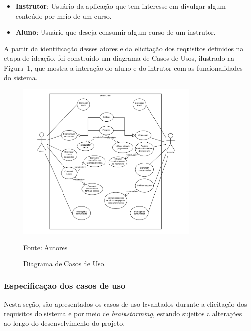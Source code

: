         \begin{itemize}
            \item \textbf{Instrutor}: Usuário da aplicação que tem interesse em divulgar algum conteúdo por meio de um curso.
            \item \textbf{Aluno}: Usuário que deseja consumir algum curso de um instrutor.
        \end{itemize}

        A partir da identificação desses atores e da elicitação dos requisitos definidos na etapa de ideação, foi construído um diagrama de Casos de Usos, ilustrado na Figura~\ref{fig:diagrama}, que mostra a interação do aluno e do intrutor com as funcionalidades do sistema.

        \begin{figure}[h]
            \centering
            \caption{Diagrama de Casos de Uso.}
            \includegraphics[width=0.8\textwidth]{figuras/uml.png}
            \begin{center}
                {\footnotesize Fonte: Autores}
            \end{center}
            \label{fig:diagrama}
        \end{figure}
        
        \subsubsection{Especificação dos casos de uso}

        Nesta seção, são apresentados os casos de uso levantados durante a elicitação dos requisitos do sistema e por meio de \textit{brainstorming}, estando sujeitos a alterações ao longo do desenvolvimento do projeto.

